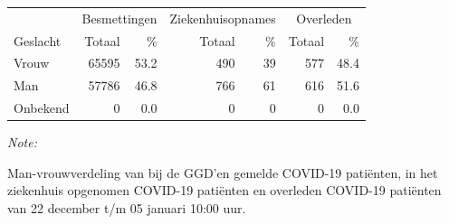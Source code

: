\documentclass[
  english,
  man,floatsintext]{apa6}
\begin{document}
\begin{table}[H]
\centering\begingroup\fontsize{11}{13}\selectfont

\begin{threeparttable}
\begin{tabular}{lrrrrrr}
\toprule
\multicolumn{1}{c}{ } & \multicolumn{2}{c}{Besmettingen} & \multicolumn{2}{c}{Ziekenhuisopnames} & \multicolumn{2}{c}{Overleden} \\
\cmidrule(l{3pt}r{3pt}){2-3} \cmidrule(l{3pt}r{3pt}){4-5} \cmidrule(l{3pt}r{3pt}){6-7}
Geslacht & Totaal & \% & Totaal & \% & Totaal & \%\\
\midrule
Vrouw & 65595 & 53.2 & 490 & 39 & 577 & 48.4\\
Man & 57786 & 46.8 & 766 & 61 & 616 & 51.6\\
Onbekend & 0 & 0.0 & 0 & 0 & 0 & 0.0\\
\bottomrule
\end{tabular}
\begin{tablenotes}
\item \textit{Note: } 
\item Man-vrouwverdeling van bij de GGD’en gemelde COVID-19 patiënten, in het ziekenhuis opgenomen COVID-19 patiënten en overleden COVID-19 patiënten van 22 december t/m 05 januari 10:00 uur.
\end{tablenotes}
\end{threeparttable}
\endgroup{}
\end{table}
\newpage
\end{document}
